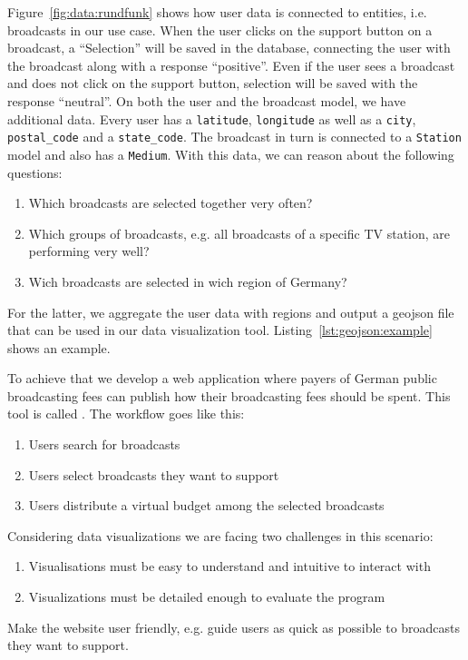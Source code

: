 \documentclass{article}
\begin{document}
Figure~\ref{fig:data:rundfunk} shows how user data is connected to entities, i.e. broadcasts in our use case.
When the user clicks on the support button on a broadcast, a ``Selection'' will be saved in the database, connecting the user with the broadcast along with a response ``positive''.
Even if the user sees a broadcast and does not click on the support button,  selection will be saved with the response ``neutral''.
On both the user and the broadcast model, we have additional data.
Every user has a \texttt{latitude}, \texttt{longitude} as well as a \texttt{city}, \texttt{postal\_code} and a \texttt{state\_code}.
The broadcast in turn is connected to a \texttt{Station} model and also has a \texttt{Medium}.
With this data, we can reason about the following questions:
\begin{enumerate}
  \item
    Which broadcasts are selected together very often?
  \item
    Which groups of broadcasts, e.g. all broadcasts of a specific TV station, are performing very well?
  \item
    Wich broadcasts are selected in wich region of Germany?
\end{enumerate}

For the latter, we aggregate the user data with regions and output a geojson file that can be used in our data visualization tool.
Listing~\ref{lst:geojson:example} shows an example.



To achieve that we develop a web application where payers of German public broadcasting fees can publish how their broadcasting fees should be spent.
This tool is called \rufu{}.
The workflow goes like this:
\begin{enumerate}
\item Users search for broadcasts
\item Users select broadcasts they want to support
\item Users distribute a virtual budget among the selected broadcasts
\end{enumerate}

Considering data visualizations we are facing two challenges in this scenario:
\begin{enumerate}
\item
Visualisations must be easy to understand and intuitive to interact with
\item
Visualizations must be detailed enough to evaluate the program
\end{enumerate}

Make the website user friendly, e.g. guide users as quick as possible to broadcasts they want to support.





\clearpage
\printbibliography
\end{document}
